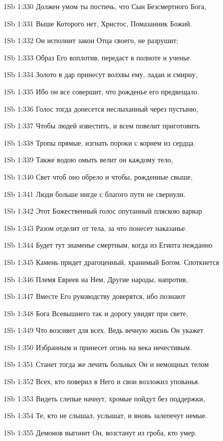 \vs 1Sb 1:330 Должен умом ты постичь, что Сын Безсмертного Бога,

\vs 1Sb 1:331 Выше Которого нет,  Христос, Помазанник Божий.

\vs 1Sb 1:332 Он исполнит закон Отца своего, не разрушит;

\vs 1Sb 1:333 Образ Его воплотив, передаст в полноте и ученье.

\vs 1Sb 1:334 Золото в дар принесут волхвы ему, ладан и смирну,

\vs 1Sb 1:335 Ибо он все совершит, что рожденье его предвещало.

\vs 1Sb 1:336 Голос тогда донесется неслыханный через пустыню,

\vs 1Sb 1:337 Чтобы людей известить, и всем повелит приготовить

\vs 1Sb 1:338 Тропы прямые, изгнать пороки с корнем из сердца.

\vs 1Sb 1:339 Также водою омыть велит он каждому тело,

\vs 1Sb 1:340 Свет чтоб оно обрело и чтобы, рожденные свыше,

\vs 1Sb 1:341 Люди больше нигде с благого пути не свернули.

\vs 1Sb 1:342 Этот Божественный голос опутанный пляскою варвар

\vs 1Sb 1:343 Разом отделит от тела, за что понесет наказанье.

\vs 1Sb 1:344 Будет тут знаменье смертным, когда из Египта нежданно

\vs 1Sb 1:345 Камень придет драгоценный, хранимый Богом. Споткнется

\vs 1Sb 1:346 Племя Евреев на Нем, Другие народы, напротив,

\vs 1Sb 1:347 Вместе Его руководству доверятся, ибо познают

\vs 1Sb 1:348 Бога Всевышнего так и дорогу увидят при свете,

\vs 1Sb 1:349 Что возсияет для всех. Ведь вечную жизнь Он укажет

\vs 1Sb 1:350 Избранным и принесет огонь на века нечестивым.

\vs 1Sb 1:351 Станет тогда же лечить больных Он и немощных телом 

\vs 1Sb 1:352 Всех, кто поверил в Него и свои возложил упованья.

\vs 1Sb 1:353 Видеть слепые начнут, хромые пойдут без поддержки,

\vs 1Sb 1:354 Те, кто не слышал, услышат, и вновь залепечут немые.

\vs 1Sb 1:355 Демонов выгонит Он, возстанут из гроба, кто умер.

